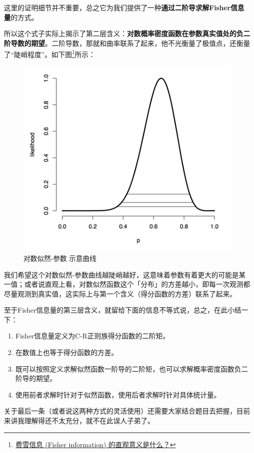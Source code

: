 \documentclass[10pt, a4paper]{article}
\begin{document}
这里的证明细节并不重要，总之它为我们提供了一种\textbf{通过二阶导求解Fisher信息量}的方式。\par

所以这个式子实际上揭示了第二层含义：\textbf{对数概率密度函数在参数真实值处的负二阶导数的期望}。二阶导数，那就和曲率联系了起来，他不光衡量了极值点，还衡量了“陡峭程度”。如下图\footnote{\href{https://www.zhihu.com/question/26561604/answer/33275982}{费雪信息 (Fisher information) 的直观意义是什么？}}所示：
\begin{figure}[H]
    \centering
    \includegraphics[width=0.8\linewidth]{likelihood.png}
    \caption{对数似然-参数 示意曲线}
    \label{fig:likelihood}
\end{figure}

我们希望这个对数似然-参数曲线越陡峭越好，这意味着参数有着更大的可能是某一值；或者说直观上看，对数似然函数这个「分布」的方差越小，即每一次观测都尽量观测到真实值，这实际上与第一个含义（得分函数的方差）联系了起来。\par
至于Fisher信息量的第三层含义，就留给下面的信息不等式说，总之，在此小结一下：
\begin{enumerate}
    \item Fisher信息量定义为C-R正则族得分函数的二阶矩。
    \item 在数值上也等于得分函数的方差。
    \item 既可以按照定义求解似然函数一阶导的二阶矩，也可以求解概率密度函数负二阶导的期望。
    \item 使用前者求解时针对于似然函数，使用后者求解时针对具体统计量。
\end{enumerate} \par
关于最后一条（或者说这两种方式的灵活使用）还需要大家结合题目去把握，目前来讲我理解得还不太充分，就不在此误人子弟了。
\end{document}
